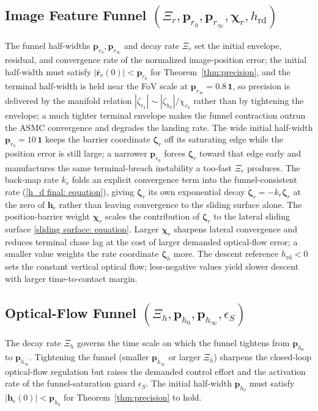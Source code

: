 \documentclass{IEEEtaes}
\theoremstyle{definition}
\theoremstyle{remark}
\begin{document}
\subsection{Image Feature Funnel $(\Xi_r, \boldsymbol{p}_{r_0}, \boldsymbol{p}_{r_\infty}, \boldsymbol{\chi}_r, h_\text{rd})$} The funnel half-widths $\boldsymbol{p}_{r_0}, \boldsymbol{p}_{r_\infty}$ and decay rate $\Xi_r$ set the initial envelope, residual, and convergence rate of the normalized image-position error; the initial half-width must satisfy $|\bar{\boldsymbol{r}}_\text{e}(0)|<\boldsymbol{p}_{r_0}$ for Theorem~\ref{thm:precision}, and the terminal half-width is held near the FoV scale at $\boldsymbol{p}_{r_\infty}=0.8\,\boldsymbol{1}$, so precision is delivered by the manifold relation $|\zeta_{r_k}|\sim|\zeta_{h_k}|/\chi_{r_k}$ rather than by tightening the envelope; a much tighter terminal envelope makes the funnel contraction outrun the ASMC convergence and degrades the landing rate. The wide initial half-width $\boldsymbol{p}_{r_0}=10\,\boldsymbol{1}$ keeps the barrier coordinate $\boldsymbol{\zeta}_r$ off its saturating edge while the position error is still large; a narrower $\boldsymbol{p}_{r_0}$ forces $\boldsymbol{\zeta}_r$ toward that edge early and manufactures the same terminal-breach instability a too-fast $\Xi_r$ produces. The back-map rate $k_r$ folds an explicit convergence term into the funnel-consistent rate (\eqref{h_d final: equation}), giving $\boldsymbol{\zeta}_r$ its own exponential decay $\dot{\boldsymbol\zeta}_r=-k_r\boldsymbol\zeta_r$ at the zero of $\boldsymbol{h}_\text{e}$ rather than leaving convergence to the sliding surface alone. The position-barrier weight $\boldsymbol{\chi}_r$ scales the contribution of $\boldsymbol{\zeta}_r$ to the lateral sliding surface \eqref{sliding surface: equation}. Larger $\boldsymbol{\chi}_r$ sharpens lateral convergence and reduces terminal chase lag at the cost of larger demanded optical-flow error; a smaller value weights the rate coordinate $\boldsymbol{\zeta}_h$ more. The descent reference $h_\text{rd}<0$ sets the constant vertical optical flow; less-negative values yield slower descent with larger time-to-contact margin.

\subsection{Optical-Flow Funnel $(\Xi_h, \boldsymbol{p}_{h_0}, \boldsymbol{p}_{h_\infty}, \epsilon_S)$} The decay rate $\Xi_h$ governs the time scale on which the funnel tightens from $\boldsymbol{p}_{h_0}$ to $\boldsymbol{p}_{h_\infty}$. Tightening the funnel (smaller $\boldsymbol{p}_{h_\infty}$ or larger $\Xi_h$) sharpens the closed-loop optical-flow regulation but raises the demanded control effort and the activation rate of the funnel-saturation guard $\epsilon_S$. The initial half-width $\boldsymbol{p}_{h_0}$ must satisfy $|\boldsymbol{h}_\text{e}(0)|<\boldsymbol{p}_{h_0}$ for Theorem~\ref{thm:precision} to hold.
\end{document}
